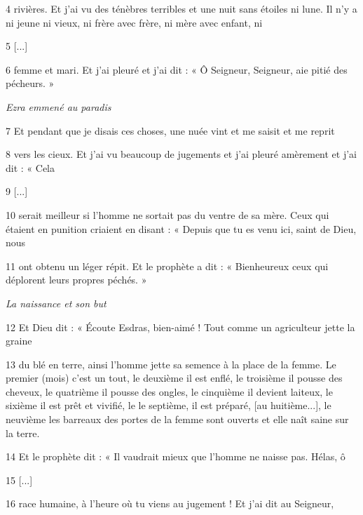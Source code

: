 \par 4 rivières. Et j'ai vu des ténèbres terribles et une nuit sans étoiles ni lune. Il n'y a ni jeune ni vieux, ni frère avec frère, ni mère avec enfant, ni

\par 5 [...]

\par 6 femme et mari. Et j’ai pleuré et j’ai dit : « Ô Seigneur, Seigneur, aie pitié des pécheurs. »

\par \textit{Ezra emmené au paradis}

\par 7 Et pendant que je disais ces choses, une nuée vint et me saisit et me reprit

\par 8 vers les cieux. Et j'ai vu beaucoup de jugements et j'ai pleuré amèrement et j'ai dit : « Cela

\par 9 [...]

\par 10 serait meilleur si l'homme ne sortait pas du ventre de sa mère. Ceux qui étaient en punition criaient en disant : « Depuis que tu es venu ici, saint de Dieu, nous

\par 11 ont obtenu un léger répit. Et le prophète a dit : « Bienheureux ceux qui déplorent leurs propres péchés. »

\par \textit{La naissance et son but}

\par 12 Et Dieu dit : « Écoute Esdras, bien-aimé ! Tout comme un agriculteur jette la graine

\par 13 du blé en terre, ainsi l'homme jette sa semence à la place de la femme. Le premier (mois) c'est un tout, le deuxième il est enflé, le troisième il pousse des cheveux, le quatrième il pousse des ongles, le cinquième il devient laiteux, le sixième il est prêt et vivifié, le le septième, il est préparé, [au huitième...], le neuvième les barreaux des portes de la femme sont ouverts et elle naît saine sur la terre.

\par 14 Et le prophète dit : « Il vaudrait mieux que l'homme ne naisse pas. Hélas, ô

\par 15 [...]

\par 16 race humaine, à l'heure où tu viens au jugement ! Et j'ai dit au Seigneur,


